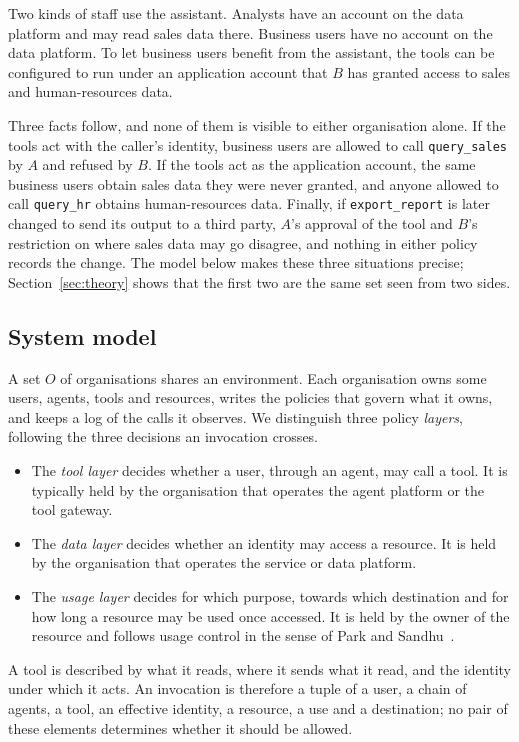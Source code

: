 \documentclass[preprint,12pt]{elsarticle}
\theoremstyle{definition}
\theoremstyle{remark}
\begin{document}
Two kinds of staff use the assistant. Analysts have an account on the data platform and may read sales data there. Business users have no account on the data platform. To let business users benefit from the assistant, the tools can be configured to run under an application account that $B$ has granted access to sales and human-resources data.

Three facts follow, and none of them is visible to either organisation alone. If the tools act with the caller's identity, business users are allowed to call \texttt{query\_sales} by $A$ and refused by $B$. If the tools act as the application account, the same business users obtain sales data they were never granted, and anyone allowed to call \texttt{query\_hr} obtains human-resources data. Finally, if \texttt{export\_report} is later changed to send its output to a third party, $A$'s approval of the tool and $B$'s restriction on where sales data may go disagree, and nothing in either policy records the change. The model below makes these three situations precise; Section~\ref{sec:theory} shows that the first two are the same set seen from two sides.

\subsection{System model}
A set $O$ of organisations shares an environment. Each organisation owns some users, agents, tools and resources, writes the policies that govern what it owns, and keeps a log of the calls it observes. We distinguish three policy \emph{layers}, following the three decisions an invocation crosses.
\begin{itemize}
\item The \emph{tool layer} decides whether a user, through an agent, may call a tool. It is typically held by the organisation that operates the agent platform or the tool gateway.
\item The \emph{data layer} decides whether an identity may access a resource. It is held by the organisation that operates the service or data platform.
\item The \emph{usage layer} decides for which purpose, towards which destination and for how long a resource may be used once accessed. It is held by the owner of the resource and follows usage control in the sense of Park and Sandhu~\cite{park2004ucon}.
\end{itemize}
A tool is described by what it reads, where it sends what it read, and the identity under which it acts. An invocation is therefore a tuple of a user, a chain of agents, a tool, an effective identity, a resource, a use and a destination; no pair of these elements determines whether it should be allowed.
\end{document}
